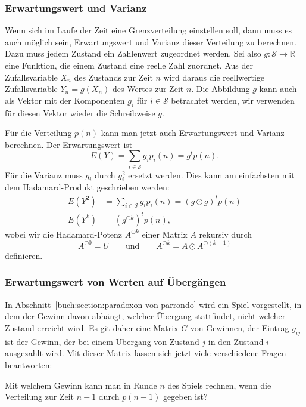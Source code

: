\subsubsection{Erwartungswert und Varianz}
Wenn sich im Laufe der Zeit eine Grenzverteilung einstellen soll, dann
muss es auch möglich sein, Erwartungswert und Varianz dieser Verteilung
zu berechnen.
Dazu muss jedem Zustand ein Zahlenwert zugeordnet werden.
Sei also
\(
g: \mathcal{S}\to \mathbb{R}
\)
eine Funktion, die einem Zustand eine reelle Zahl zuordnet.
Aus der Zufallsvariable $X_n$ des Zustands zur Zeit $n$ wird daraus
die reellwertige Zufallsvariable $Y_n=g(X_n)$ des Wertes zur Zeit $n$.
Die Abbildung $g$ kann auch als Vektor mit der Komponenten $g_i$ 
für $i\in\mathcal{S}$ betrachtet werden, wir verwenden für diesen
Vektor wieder die Schreibweise $g$.

Für die Verteilung $p(n)$ kann man jetzt auch Erwartungswert und
Varianz berechnen.
Der Erwartungswert ist
\[
E(Y)
=
\sum_{i\in\mathcal{S}} g_i p_i(n)
=
g^t p(n).
\]
Für die Varianz muss $g_i$ durch $g_i^2$ ersetzt werden.
Dies kann am einfachsten mit dem Hadamard-Produkt geschrieben werden:
\begin{align*}
E(Y^2)
&=
\sum_{i\in\mathcal{S}} g_i p_i(n)
=
(g\odot g)^t p(n)
\\
E(Y^k)
&=
(g^{\odot k})^t p(n),
\end{align*}
wobei wir die Hadamard-Potenz $A^{\odot k}$ einer Matrix $A$ rekursiv
durch
\[
A^{\odot 0}=U
\qquad\text{und}\qquad
A^{\odot k} = A\odot A^{\odot (k-1)}
\]
definieren.

\subsubsection{Erwartungswert von Werten auf Übergängen}
In Abschnitt~\ref{buch:section:paradoxon-von-parrondo} wird ein Spiel
vorgestellt, in dem der Gewinn davon abhängt, welcher Übergang stattfindet,
nicht welcher Zustand erreicht wird.
Es git daher eine Matrix $G$ von Gewinnen, der Eintrag $g_{i\!j}$ ist
der Gewinn, der bei einem Übergang von Zustand $j$ in den Zustand $i$
ausgezahlt wird.
Mit dieser Matrix lassen sich jetzt viele verschiedene Fragen beantworten:

\begin{frage}
\label{buch:wahrscheinlichkeit:frage1}
Mit welchem Gewinn kann man in Runde $n$ des Spiels rechnen,
wenn die Verteilung zur Zeit $n-1$ durch $p(n-1)$ gegeben ist?
\end{frage}

